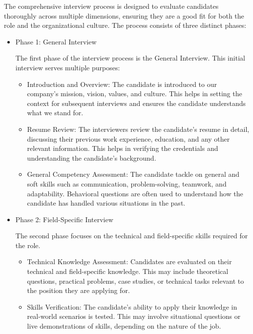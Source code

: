 The comprehensive interview process is designed to evaluate candidates thoroughly across multiple dimensions, ensuring they are a good fit for both the role and the organizational culture. The process consists of three distinct phases:
\begin{itemize}
\item Phase 1: General Interview

The first phase of the interview process is the General Interview. This initial interview serves multiple purposes:

     \begin{itemize}

    \item Introduction and Overview:
        The candidate is introduced to our company's mission, vision, values, and culture. This helps in setting the context for subsequent interviews and ensures the candidate understands what we stand for.

    \item Resume Review:
        The interviewers review the candidate’s resume in detail, discussing their previous work experience, education, and any other relevant information. This helps in verifying the credentials and understanding the candidate’s background.

    \item General Competency Assessment:
        The candidate tackle on general and soft skills such as communication, problem-solving, teamwork, and adaptability. Behavioral questions are often used to understand how the candidate has handled various situations in the past.
   \end{itemize} 
\item Phase 2: Field-Specific Interview

The second phase focuses on the technical and field-specific skills required for the role.
    \begin{itemize}
    \item Technical Knowledge Assessment:
        Candidates are evaluated on their technical and field-specific knowledge. This may include theoretical questions, practical problems, case studies, or technical tasks relevant to the position they are applying for.

    \item Skills Verification:
        The candidate’s ability to apply their knowledge in real-world scenarios is tested. This may involve situational questions or live demonstrations of skills, depending on the nature of the job.


\end{itemize}
\end{itemize}
